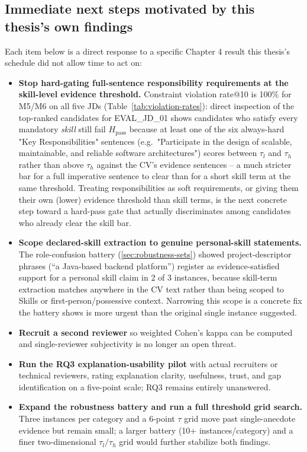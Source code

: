 \documentclass[12pt,a4paper,oneside]{report}
\begin{document}
\subsection{Immediate next steps motivated by this thesis's own findings}
Each item below is a direct response to a specific Chapter 4 result this thesis's schedule did not allow time to act on:
\begin{itemize}
  \item \textbf{Stop hard-gating full-sentence responsibility requirements at the skill-level evidence threshold.} Constraint violation rate@10 is 100\% for M5/M6 on all five JDs (Table~\ref{tab:violation-rates}): direct inspection of the top-ranked candidates for EVAL\_JD\_01 shows candidates who satisfy every mandatory \emph{skill} still fail $H_{\mathrm{pass}}$ because at least one of the six always-hard "Key Responsibilities" sentences (e.g.\ "Participate in the design of scalable, maintainable, and reliable software architectures") scores between $\tau_l$ and $\tau_h$ rather than above $\tau_h$ against the CV's evidence sentences -- a much stricter bar for a full imperative sentence to clear than for a short skill term at the same threshold. Treating responsibilities as soft requirements, or giving them their own (lower) evidence threshold than skill terms, is the next concrete step toward a hard-pass gate that actually discriminates among candidates who already clear the skill bar.
  \item \textbf{Scope declared-skill extraction to genuine personal-skill statements.} The role-confusion battery (\cref{sec:robustness-sets}) showed project-descriptor phrases (``a Java-based backend platform'') register as evidence-satisfied support for a personal skill claim in 2 of 3 instances, because skill-term extraction matches anywhere in the CV text rather than being scoped to Skills or first-person/possessive context. Narrowing this scope is a concrete fix the battery shows is more urgent than the original single instance suggested.
  \item \textbf{Recruit a second reviewer} so weighted Cohen's kappa \citep{cohen1968} can be computed and single-reviewer subjectivity is no longer an open threat.
  \item \textbf{Run the RQ3 explanation-usability pilot} with actual recruiters or technical reviewers, rating explanation clarity, usefulness, trust, and gap identification on a five-point scale; RQ3 remains entirely unanswered.
  \item \textbf{Expand the robustness battery and run a full threshold grid search.} Three instances per category and a 6-point $\tau$ grid move past single-anecdote evidence but remain small; a larger battery (10+ instances/category) and a finer two-dimensional $\tau_l/\tau_h$ grid would further stabilize both findings.
\end{itemize}
\end{document}
